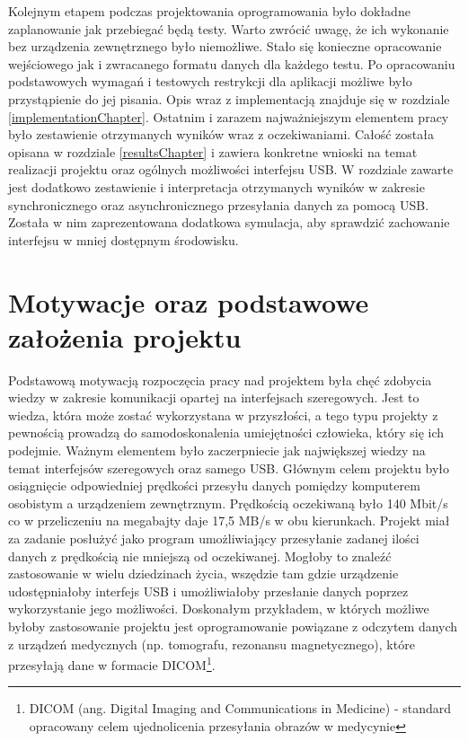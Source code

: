 \documentclass{BscUS}
\begin{document}
\newline
\indent Kolejnym etapem podczas projektowania oprogramowania było dokładne zaplanowanie jak przebiegać będą testy. Warto zwrócić uwagę, że ich wykonanie bez urządzenia zewnętrznego było niemożliwe. Stało się konieczne opracowanie wejściowego jak i zwracanego formatu danych dla każdego testu. Po opracowaniu podstawowych wymagań i testowych restrykcji dla aplikacji możliwe było przystąpienie do jej pisania. Opis wraz z implementacją znajduje się w rozdziale \ref{implementationChapter}.
\newline
\indent Ostatnim i zarazem najważniejszym elementem pracy było zestawienie otrzymanych wyników wraz z oczekiwaniami. Całość została opisana w rozdziale \ref{resultsChapter} i zawiera konkretne wnioski na temat realizacji projektu oraz ogólnych możliwości interfejsu USB. W rozdziale zawarte jest dodatkowo zestawienie i interpretacja otrzymanych wyników w zakresie synchronicznego oraz asynchronicznego przesyłania danych za pomocą USB. Została w nim zaprezentowana dodatkowa symulacja, aby sprawdzić zachowanie interfejsu w mniej dostępnym środowisku.

\chapter{Motywacje oraz podstawowe założenia projektu}
\label{ch:motivationAndBasics}
\indent Podstawową motywacją rozpoczęcia pracy nad projektem była chęć zdobycia wiedzy w zakresie komunikacji opartej na interfejsach szeregowych. Jest to wiedza, która może zostać wykorzystana w przyszłości, a tego typu projekty z pewnością prowadzą do samodoskonalenia umiejętności człowieka, który się ich podejmie. Ważnym elementem było zaczerpniecie jak największej wiedzy na temat interfejsów szeregowych oraz samego USB.
\newline
\indent Głównym celem projektu było osiągnięcie odpowiedniej prędkości przesyłu danych pomiędzy komputerem osobistym a urządzeniem zewnętrznym. Prędkością oczekiwaną było 140 Mbit/s co w przeliczeniu na megabajty daje 17,5 MB/s w obu kierunkach. Projekt miał za zadanie posłużyć jako program umożliwiający przesyłanie zadanej ilości danych z prędkością nie mniejszą od oczekiwanej. Mogłoby to znaleźć zastosowanie w wielu dziedzinach życia, wszędzie tam gdzie urządzenie udostępniałoby interfejs USB i umożliwiałoby przesłanie danych poprzez wykorzystanie jego możliwości. Doskonałym przykładem, w których możliwe byłoby zastosowanie projektu jest oprogramowanie powiązane z odczytem danych z urządzeń medycznych (np. tomografu, rezonansu magnetycznego), które przesyłają dane w formacie DICOM\footnote{DICOM (ang. Digital Imaging and Communications in Medicine) - standard opracowany celem ujednolicenia przesyłania obrazów w medycynie}.
\end{document}

